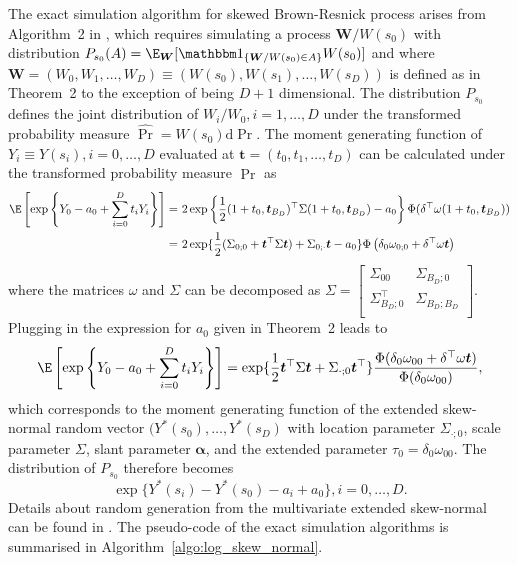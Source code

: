 \documentclass[12pt]{article}
\begin{document}
The exact simulation algorithm for skewed Brown-Resnick process arises from Algorithm~2 in \cite{Dombry.Engelke.Oesting:2016}, which requires simulating a process $\bm W/W(s_0)$ with distribution $P_{s_0}(A) = \E_{\bm W}[\mathbbm 1_{\{\bm W/W(s_0)\in A\}}W(s_0)]$ and where $\bm W = (W_0, W_1, \ldots, W_D) \equiv \left( W(s_0), W(s_1), \ldots, W(s_D)\right)$ is  defined as in Theorem~2 to the exception of being $D+1$ dimensional.
The distribution $P_{s_0}$ defines the joint distribution of $W_i/W_0, i=1,\dots,D$ under the transformed probability measure $\hat \Pr = W(s_0)\text{d}\Pr$. The moment generating function of $Y_i \equiv Y(s_i),i=0,\dots,D$ evaluated at $\bm t = (t_0, t_1, \ldots, t_D)$ can be calculated under the transformed probability measure $\hat\Pr$ as
\begin{align*}
	\E\left[\exp\left\{Y_0-a_0 + \sum_{i=0}^D t_i Y_i\right\}\right]
	=&\ 2\exp\left\{\frac{1}{2}(1+t_0,\bm t_{B_D})^\top\Sigma(1+t_0,\bm t_{B_D})-a_0 \right\} \Phi(\delta^\top\omega(1+t_0,\bm t_{B_D}))\\
	 =&\ 2\exp\{\frac{1}{2}(\Sigma_{0;0} + \bm t^\top\Sigma \bm t) + \Sigma_{0;\cdot} \bm t - a_0\}\Phi\left(\delta_0\omega_{0;0} + \delta^\top\omega \bm t\right) 
\end{align*}        
where the matrices $\omega$ and $\Sigma$ can be decomposed as $\Sigma = \begin{bmatrix}
	\Sigma_{00} & \Sigma_{B_D;0} \\
	\Sigma_{B_D;0}^\top & \Sigma_{B_D;B_D} \\
\end{bmatrix}$. 
%
Plugging in the expression for $a_0$ given in Theorem~2 leads to 
%
\begin{equation*}
\E\left[\exp\left\{Y_0-a_0 + \sum_{i=0}^D t_i Y_i\right\}\right] = \exp\{\frac{1}{2} \bm t^\top\Sigma \bm t + \Sigma_{\cdot;0} \bm t^\top \} 
\frac{\Phi(\delta_0\omega_{00} + \delta^\top\omega \bm t)}{\Phi(\delta_0\omega_{00})}, 
\end{equation*}
%
which corresponds to the moment generating function of the extended skew-normal random vector $(Y^*(s_0),\ldots,Y^*(s_D)$ with location parameter $\Sigma_{\cdot;0}$, scale parameter $\Sigma$, slant parameter $\bm\alpha$, and the extended parameter $\tau_0 = \delta_0\omega_{00}$. The distribution of $P_{s_0}$ therefore becomes 
%
$$\exp\{Y^*(s_i)-Y^*(s_0)-a_i + a_0\}, i=0,\dots,D.$$
%
Details about random generation from the multivariate extended skew-normal can be found in \citet[Chapter 5.3.3]{Azzalini:2013}. The pseudo-code of the exact simulation algorithms is summarised in Algorithm~\ref{algo:log_skew_normal}.   
\end{document}
